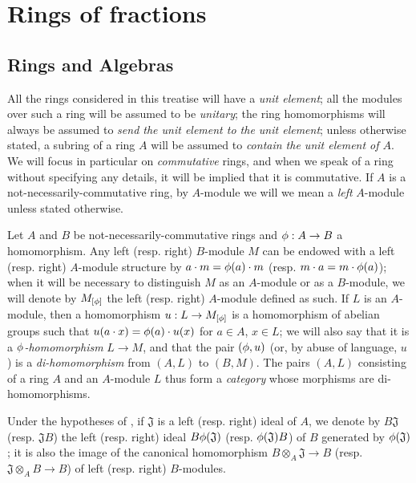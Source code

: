 \section{Rings of fractions}
\label{section:0.1}

\setcounter{subsection}{-1}
\subsection{Rings and Algebras}
\label{subsection:0.1.0}

\begin{env}[1.0.1]
\label{0.1.0.1}
All the rings considered in this treatise will have a \emph{unit element};
all the modules over such a ring will be assumed to be \emph{unitary};
the ring homomorphisms will always be assumed to \emph{send the unit element to the unit element};
unless otherwise stated, a subring of a ring $A$ will be assumed to \emph{contain the unit element of $A$}.
We will focus in particular on \emph{commutative} rings, and when we speak of a ring without specifying any details, it will be implied that it is commutative.
If $A$ is a not-necessarily-commutative ring, by $A$-module we will we mean a \emph{left} $A$-module unless stated otherwise.
\end{env}

\begin{env}[1.0.2]
\label{0.1.0.2}
Let $A$ and $B$ be not-necessarily-commutative rings and $\vphi:A\to B$ a homomorphism.
Any left (resp. right) $B$-module $M$ can be endowed with a left (resp. right) $A$-module structure by $a\cdot m=\phi(a)\cdot m$ (resp. $m\cdot a=m\cdot\phi(a)$);
when it will be necessary to distinguish $M$ as an $A$-module or as a $B$-module, we will denote by $M_{[\phi]}$ the left (resp. right) $A$-module defined as such.
If $L$ is an $A$-module, then a homomorphism $u:L\to M_{[\vphi]}$ is a homomorphism of abelian groups such that $u(a\cdot x)=\phi(a)\cdot u(x)$ for $a\in A$, $x\in L$;
we will also say that it is a \emph{$\phi$-homomorphism} $L\to M$, and that the pair $(\phi,u)$ (or, by abuse of language, $u$) is a \emph{di-homomorphism} from $(A,L)$ to $(B,M)$.
The pairs $(A,L)$ consisting of a ring $A$ and an $A$-module $L$ thus form a \emph{category} whose morphisms are di-homomorphisms.
\end{env}

\begin{env}[1.0.3]
\label{0.1.0.3}
Under the hypotheses of , if $\mathfrak{J}$ is a left (resp. right) ideal of $A$, we denote by $B\mathfrak{J}$ (resp. $\mathfrak{J}B$) the left (resp. right) ideal $B\phi(\mathfrak{J})$ (resp. $\phi(\mathfrak{J})B$) of $B$ generated by $\phi(\mathfrak{J})$;
it is also the image of the canonical homomorphism $B\otimes_A\mathfrak{J}\to B$ (resp. $\mathfrak{J}\otimes_A B\to B$) of left (resp. right) $B$-modules.
\end{env}

